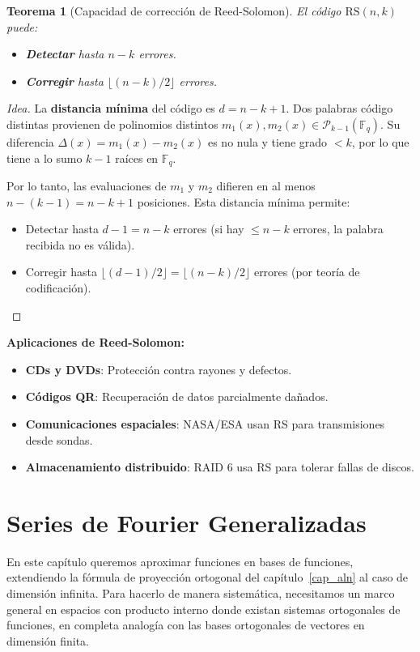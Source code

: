 \documentclass[a4paper,11pt]{report}
\newtheorem{theorem}{Teorema}[chapter]
\begin{document}
\begin{theorem}[Capacidad de corrección de Reed-Solomon]
El código $\text{RS}(n,k)$ puede:
\begin{itemize}
\item \textbf{Detectar} hasta $n - k$ errores.
\item \textbf{Corregir} hasta $\lfloor (n-k)/2 \rfloor$ errores.
\end{itemize}
\end{theorem}

\begin{proof}[Idea]
La \textbf{distancia mínima} del código es $d = n - k + 1$. Dos palabras código distintas provienen de polinomios distintos $m_1(x), m_2(x) \in \mathcal{P}_{k-1}(\mathbb{F}_q)$. Su diferencia $\Delta(x) = m_1(x) - m_2(x)$ es no nula y tiene grado $< k$, por lo que tiene a lo sumo $k-1$ raíces en $\mathbb{F}_q$.

Por lo tanto, las evaluaciones de $m_1$ y $m_2$ difieren en al menos $n - (k-1) = n - k + 1$ posiciones. Esta distancia mínima permite:
\begin{itemize}
\item Detectar hasta $d-1 = n-k$ errores (si hay $\leq n-k$ errores, la palabra recibida no es válida).
\item Corregir hasta $\lfloor (d-1)/2 \rfloor = \lfloor (n-k)/2 \rfloor$ errores (por teoría de codificación).
\end{itemize}
\end{proof}

\textbf{Aplicaciones de Reed-Solomon:}
\begin{itemize}
\item \textbf{CDs y DVDs}: Protección contra rayones y defectos.
\item \textbf{Códigos QR}: Recuperación de datos parcialmente dañados.
\item \textbf{Comunicaciones espaciales}: NASA/ESA usan RS para transmisiones desde sondas.
\item \textbf{Almacenamiento distribuido}: RAID 6 usa RS para tolerar fallas de discos.
\end{itemize}



\chapter{Series de Fourier Generalizadas}\label{cap_fourier_generalizado}

En este capítulo queremos aproximar funciones en bases de funciones, extendiendo la fórmula de proyección ortogonal del capítulo~\ref{cap_aln} al caso de dimensión infinita. Para hacerlo de manera sistemática, necesitamos un marco general en espacios con producto interno donde existan sistemas ortogonales de funciones, en completa analogía con las bases ortogonales de vectores en dimensión finita.
\end{document}
